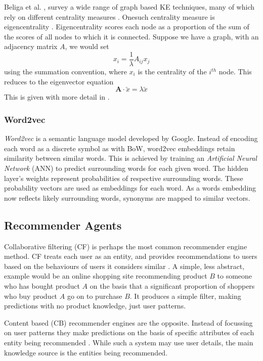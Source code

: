 Beliga et al. \cite{Beliga2015}, survey a wide range of graph based KE techniques, many of which rely on different 
centrality measures . Onesuch centrality measure is 
eigencentrality \cite{Bonacich2007}. 
Eigencentrality scores each node as a proportion of the sum of the scores of all nodes to which it is connected. 
Suppose we have a graph, with an adjacency matrix $A$, we would set
\begin{equation}
    x_i = \frac{1}{\lambda}A_{ij}x_j
\end{equation}
using the summation convention, where $x_i$ is the centrality of the $i^{th}$ node. This reduces to the eigenvector equation 
\begin{equation}
    \textbf{A}\cdot \utilde{x} = \lambda \utilde{x}
\end{equation} This is given with more detail in \cite{Newman2010}.

\subsubsection{Word2vec}\label{ssec:w2v}
\emph{Word2vec} is a semantic language model developed by Google.  Instead of encoding each word as a discrete symbol
as with BoW, word2vec embeddings retain similarity between similar words. This is achieved by training an \emph{Artificial 
Neural Network} (ANN) to predict surrounding words for each given word.  The hidden layer's weights represent
probabilities of respective surrounding words. These probability vectors are used as embeddings for each word. As a words
embedding now reflects likely surrounding words, synonyms are mapped to similar vectors.
\cite{Mikolov2013, McCormick2017, Liu2020}

\subsection{Recommender Agents}\label{ssec:recommenders}
Collaborative filtering (CF) is perhaps the most common recommender engine method. CF treats each user as an entity, 
and provides recommendations to users based on the behaviours of users it considers similar 
\cite{Melville2010, Herlocker2000}. A simple, less abstract, example would be an online shopping site recommending
product $B$ to someone who has bought product $A$ on the basis that a significant proportion of shoppers who buy
product $A$ go on to purchase $B$.  It produces a simple filter, making predictions with no product knowledge,
just user patterns.

Content based (CB) recommender engines are the opposite.  Instead of focussing on user patterns they make predictions
on the basis of specific attributes of each entity being recommended \cite{Melville2010, Mooney2000}.  While such a 
system may use user details, the main knowledge source is the entities being recommended.

